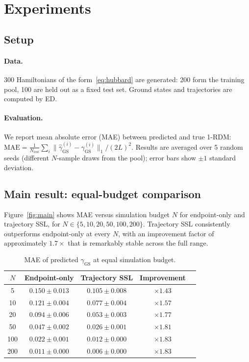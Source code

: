 \documentclass[12pt]{article}
\newcommand{\ghat}{\hat{\gamma}}
\newcommand{\gGS}{\gamma_{\mathrm{GS}}}
\newcommand{\RMAE}{\mathrm{MAE}}
\begin{document}
\section{Experiments}
\label{sec:experiments}

\subsection{Setup}

\paragraph{Data.}
300 Hamiltonians of the form~\eqref{eq:hubbard} are generated:
200 form the training pool, 100 are held out as a fixed test set.
Ground states and trajectories are computed by ED.

\paragraph{Evaluation.}
We report mean absolute error (MAE) between predicted and true 1-RDM:
$\RMAE = \frac{1}{N_\mathrm{test}} \sum_i \|\ghat_{\mathrm{GS}}^{(i)} - \gGS^{(i)}\|_1 / (2L)^2$.
Results are averaged over 5 random seeds (different $N$-sample draws from the pool);
error bars show $\pm 1$ standard deviation.

\subsection{Main result: equal-budget comparison}
\label{sec:main}

Figure~\ref{fig:main} shows MAE versus simulation budget $N$
for endpoint-only and trajectory SSL, for $N \in \{5, 10, 20, 50, 100, 200\}$.
Trajectory SSL consistently outperforms endpoint-only at every $N$,
with an improvement factor of approximately $1.7\times$ that is
remarkably stable across the full range.

\begin{table}[h]
\centering
\small
\caption{MAE of predicted $\gGS$ at equal simulation budget.}
\label{tab:main}
\begin{tabular}{ccccc}
\toprule
$N$ & Endpoint-only & Trajectory SSL & Improvement \\
\midrule
5   & $0.150 \pm 0.013$ & $0.105 \pm 0.008$ & $\times 1.43$ \\
10  & $0.121 \pm 0.004$ & $0.077 \pm 0.004$ & $\times 1.57$ \\
20  & $0.094 \pm 0.006$ & $0.053 \pm 0.003$ & $\times 1.77$ \\
50  & $0.047 \pm 0.002$ & $0.026 \pm 0.001$ & $\times 1.81$ \\
100 & $0.022 \pm 0.001$ & $0.012 \pm 0.000$ & $\times 1.83$ \\
200 & $0.011 \pm 0.000$ & $0.006 \pm 0.000$ & $\times 1.83$ \\
\bottomrule
\end{tabular}
\end{table}
\end{document}
